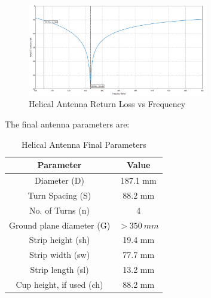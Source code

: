 \begin{figure}[!htb]
  \centering
  \includegraphics[width=0.7\textwidth]{helix7_returnLoss}
  \caption{Helical Antenna Return Loss vs Frequency}
  \label{fig:helix7_returnLoss}
\end{figure}

The final antenna parameters are:
\begin{table}[!htb]
  \centering
  \renewcommand{\arraystretch}{1.2}
  \begin{tabular}{ |c|c| }
  \hline
  \textbf{Parameter}                  & \textbf{Value}    \\
  \hline
  Diameter (D)                        & 187.1 mm          \\ \hline
  Turn Spacing (S)                    & 88.2 mm           \\ \hline
  No. of Turns (n)                    & 4                 \\ \hline
  Ground plane diameter (G)           & $> \SI{350}{mm}$  \\ \hline
  Strip height (sh)                   & 19.4 mm          \\ \hline
  Strip width (sw)                    & 77.7 mm           \\ \hline
  Strip length (sl)                   & 13.2 mm          \\ \hline
  Cup height, if used (ch)            & 88.2 mm           \\ \hline
  \end{tabular}
  \caption{Helical Antenna Final Parameters}
  \label{tab:helicalParameters}
\end{table}